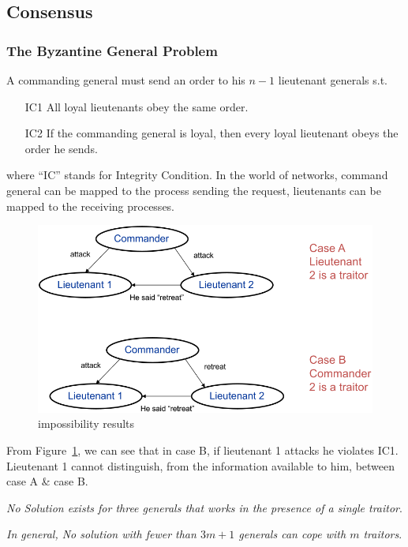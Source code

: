 \documentclass[twocolumn,landscape,10pt]{article}
\theoremstyle{definition}
\begin{document}
\subsection{Consensus}

\subsubsection{The Byzantine General Problem}

A commanding general must send an order to his $n-1$ lieutenant generals s.t.
\begin{itemize}
    \item[IC1] All loyal lieutenants obey the same order.
    \item[IC2] If the commanding general is loyal, then every loyal lieutenant
        obeys the order he sends.
\end{itemize} 
where ``IC'' stands for Integrity Condition.
In the world of networks, command general can be mapped to the process sending
the request, lieutenants can be mapped to the receiving processes.

\begin{figure}[h]
  	\includegraphics[scale=0.35]{byzantine.png}
  	\centering
    \caption{impossibility results}\label{fig:byz}
\end{figure}

From Figure~\ref{fig:byz}, we can see that in case B, if lieutenant 1 attacks
he violates IC1. Lieutenant 1 cannot distinguish, from the information available
to him, between case A \& case B.

\emph{No Solution exists for three generals that works in the presence of a
single traitor}.

\emph{In general, No solution with fewer than $3m+1$ generals can cope with $m$
traitors}.
\end{document}

